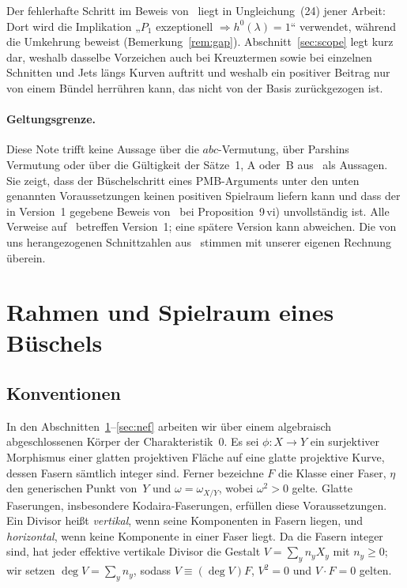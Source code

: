 \documentclass[11pt]{article}
\theoremstyle{definition}
\theoremstyle{remark}
\begin{document}
Der fehlerhafte Schritt im Beweis von~\cite[Prop.~9]{So26} liegt in
Ungleichung~(24) jener Arbeit: Dort wird die Implikation „$P_1$ exzeptionell
$\Rightarrow
h^0(\lambda)=1$“ verwendet, während~\cite[Prop.~5\,ii)]{So26} die Umkehrung
beweist (Bemerkung~\ref{rem:gap}). Abschnitt~\ref{sec:scope} legt kurz dar,
weshalb dasselbe Vorzeichen auch bei Kreuztermen sowie bei einzelnen Schnitten und
Jets längs Kurven auftritt und weshalb ein positiver Beitrag nur von einem Bündel
herrühren kann, das nicht von der Basis zurückgezogen ist.

\paragraph{Geltungsgrenze.}
Diese Note trifft keine Aussage über die $abc$-Vermutung, über Parshins Vermutung
oder über die Gültigkeit der Sätze~1, A oder~B aus~\cite{So26} als Aussagen. Sie
zeigt, dass der Büschelschritt eines PMB-Arguments unter den unten genannten
Voraussetzungen keinen positiven Spielraum liefern kann und dass der in Version~1
gegebene Beweis von~\cite[Theorem~1]{So26} bei Proposition~9\,vi) unvollständig
ist. Alle Verweise auf~\cite{So26} betreffen Version~1; eine spätere Version kann
abweichen. Die von uns herangezogenen Schnittzahlen
aus~\cite[Prop.~8 und Prop.~9\,ii), iii)]{So26} stimmen mit unserer eigenen
Rechnung überein.

\section{Rahmen und Spielraum eines Büschels}\label{sec:setting}

\subsection{Konventionen}
In den Abschnitten~\ref{sec:setting}--\ref{sec:nef} arbeiten wir über einem
algebraisch abgeschlossenen Körper der Charakteristik~$0$. Es sei $\phi\colon X\to
Y$ ein surjektiver Morphismus einer glatten projektiven Fläche auf eine glatte
projektive Kurve, dessen Fasern sämtlich integer sind. Ferner bezeichne $F$ die
Klasse einer Faser, $\eta$ den generischen Punkt von~$Y$ und
$\omega=\omega_{X/Y}$, wobei $\omega^2>0$ gelte. Glatte Faserungen, insbesondere
Kodaira-Faserungen, erfüllen diese Voraussetzungen. Ein Divisor heißt
\emph{vertikal}, wenn seine Komponenten in Fasern liegen, und \emph{horizontal},
wenn keine Komponente in einer Faser liegt. Da die Fasern integer sind, hat jeder
effektive vertikale Divisor die Gestalt $V=\sum_y n_yX_y$ mit $n_y\ge 0$; wir
setzen $\deg V=\sum_y n_y$, sodass $V\equiv(\deg V)F$, $V^2=0$ und $V\cdot F=0$
gelten.
\end{document}
